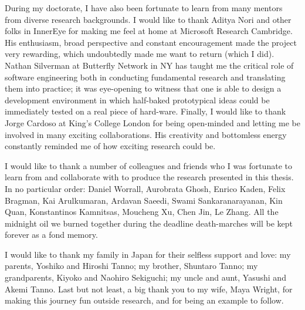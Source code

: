\documentclass[12pt,a4paper,twoside]{book}
\begin{document}
During my doctorate, I have also been fortunate to learn from many mentors from diverse research backgrounds. I would like to thank Aditya Nori and other folks in InnerEye for making me feel at home at Microsoft Research Cambridge. His enthusiasm, broad perspective and constant encouragement made the project very rewarding, which undoubtedly made me want to return (which I did). Nathan Silverman at Butterfly Network in NY has taught me the critical role of software engineering both in conducting fundamental research and translating them into practice; it was eye-opening to witness that one is able to design a development environment in which half-baked prototypical ideas could be immediately tested on a real piece of hard-ware. Finally, I would like to thank Jorge Cardoso at King's College London for being open-minded and letting me be involved in many exciting collaborations. His creativity and bottomless energy constantly reminded me of how exciting research could be. 

I would like to thank a number of colleagues and friends who I was fortunate to learn from and collaborate with to produce the research presented in this thesis. In no particular order:  Daniel Worrall, Aurobrata Ghosh, Enrico Kaden, Felix Bragman, Kai Arulkumaran,  Ardavan Saeedi, Swami Sankaranarayanan, Kin Quan,  Konstantinos Kamnitsas, Moucheng Xu, Chen Jin, Le Zhang. All the midnight oil we burned together during the deadline death-marches will be kept forever as a fond memory. 

I would like to thank my family in Japan for their selfless support and love: my parents, Yoshiko and Hiroshi Tanno; my brother, Shuntaro Tanno; my grandparents, Kiyoko and Naohiro Sekiguchi; my uncle and aunt, Yasushi and Akemi Tanno.  Last but not least, a big thank you to my wife, Maya Wright, for making this journey fun outside research, and for being an example to follow. 








%
%
%
%
%
%
%
%
%
%
%
%
%
%
%
% 
 
\end{document}
